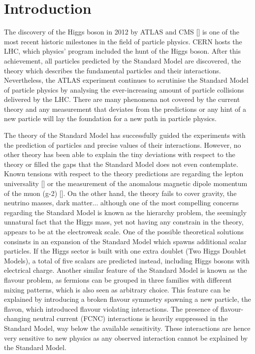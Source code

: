 \setchapterpreamble[u]{\margintoc}
\chapter*{Introduction}

The discovery of the Higgs boson in 2012 by ATLAS and CMS [] is one of the most recent historic milestones in the field of particle physics. CERN hosts the LHC, which physics' program included the hunt of the Higgs boson. After this achievement, all particles predicted by the Standard Model are discovered, the theory which describes the fundamental particles and their interactions. Nevertheless, the ATLAS experiment continues to scrutinise the Standard Model of particle physics by analysing the ever-increasing amount of particle collisions delivered by the LHC. There are many phenomena not covered by the current theory and any measurement that deviates from the predictions or any hint of a new particle will lay the foundation for a new path in particle physics.

The theory of the Standard Model has successfully guided the experiments with the prediction of particles and precise values of their interactions. However, no other theory has been able to explain the tiny deviations with respect to the theory or filled the gaps that the Standard Model does not even contemplate. Known tensions with respect to the theory predictions are regarding the lepton universality [] or the measurement of the anomalous magnetic dipole momentum of the muon (g-2) []. On the other hand, the theory fails to cover gravity, the neutrino masses, dark matter... although one of the most compelling concerns regarding the Standard Model is known as the hierarchy problem, the seemingly unnatural fact that the Higgs mass, yet not having any constrain in the theory, appears to be at the electroweak scale. One of the possible theoretical solutions consinsts in an expansion of the Standard Model which spawns additional scalar particles. If the Higgs sector is built with one extra doublet (Two Higgs Doublet Models), a total of five scalars are predicted instead, including Higgs bosons with electrical charge.
Another similar feature of the Standard Model is known as the flavour problem, as fermions can be grouped in three families with different mixing patterns, which is also seen as arbitrary choice. This feature can be explained by introducing a broken flavour symmetry spawning a new particle, the flavon, which introduced flavour violating interactions. The presence of flavour-changing neutral current (FCNC) interactions is heavily suppressed in the Standard Model, way below the available sensitivity. These interactions are hence very sensitive to new physics as any observed interaction cannot be explained by the Standard Model.

